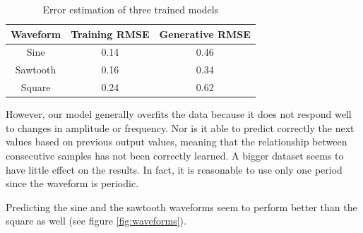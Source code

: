 \documentclass[conference]{IEEEtran}
\begin{document}


\begin{table}[!t]
  \renewcommand{\arraystretch}{1.4}
  \caption{Error estimation of three trained models}
  \label{tab:err}
  \centering
  \begin{tabular}{|c|c|c|}
    \hline
    Waveform & Training RMSE & Generative RMSE \\
    \hline
    Sine & 0.14 & 0.46 \\
    \hline
    Sawtooth & 0.16 & 0.34 \\
    \hline
    Square & 0.24 & 0.62 \\
    \hline
  \end{tabular}
\end{table}

However, our model generally overfits the data because it does not respond well to changes in amplitude or frequency. Nor is it able to predict correctly the next values based on previous output values, meaning that the relationship between consecutive samples has not been correctly learned. A bigger dataset seems to have little effect on the results. In fact, it is reasonable to use only one period since the waveform is periodic.


Predicting the sine and the sawtooth waveforms seem to perform better than the square as well (see figure \ref{fig:waveforms}).
\end{document}
